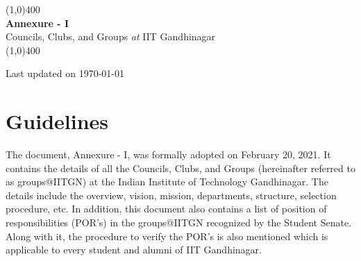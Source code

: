 \documentclass[12pt]{article}
\begin{document}
\begin{titlepage}

\quad

\quad

\begin{center}    
        


\quad

    \vspace{2 in}
    
    \line(1,0){400} \\
    [0.1in]
    \huge{\bfseries Annexure - I}\\
    \huge{Councils, Clubs, and Groups \textit{at} IIT Gandhinagar}\\
    [0.1in]
    \line(1,0){400} \\
\end{center}

\quad

\vspace{2.5 in}


\noindent \large{Last updated on \today}


\end{titlepage}

\newpage

\section*{Guidelines}
The document, Annexure - I, was formally adopted on February 20, 2021. It contains the details of all the Councils, Clubs, and Groups (hereinafter referred to as groups$@$IITGN) at the Indian Institute of Technology Gandhinagar. The details include the overview, vision, mission, departments, structure, selection procedure, etc. In addition, this document also contains a list of position of responsibilities (POR's) in the groups$@$IITGN recognized by the Student Senate. Along with it, the procedure to verify the POR's is also mentioned which is applicable to every student and alumni of IIT Gandhinagar. \\
\end{document}
